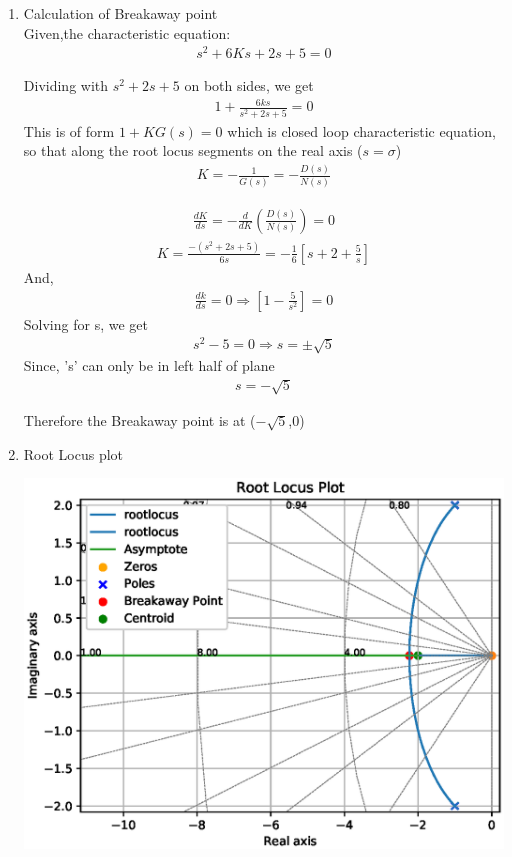 \begin{enumerate}[label=\thesection.\arabic*.,ref=\thesection.\theenumi]
\item Calculation of Breakaway point \\

Given,the characteristic equation:
    \begin{align}
        s^2 + 6Ks + 2s + 5 = 0    
    \end{align}
    
    Dividing with $s^2 + 2s + 5$ on both sides, we get
    \begin{align}
        1+\frac{6 k s}{s^{2}+2 s+5}=0    
    \end{align}
    This is of form $1+KG(s)=0$ which is closed loop characteristic equation, so that along the root locus
    segments on the real axis ($s = \sigma$)
    \begin{align}
        K=-\frac{1}{G(s)}=-\frac{D(s)}{N(s)}    
    \end{align}

    \begin{align}
        \frac{d K}{d s}=-\frac{d}{d K}\left(\frac{D(s)}{N(s)}\right)=0    
    \end{align}
    \begin{align}
        K=\frac{-\left(s^{2}+2 s+5\right)}{6 s}=-\frac{1}{6}\left[s+2+\frac{5}{s}\right]    
    \end{align}
    And,
    \begin{align}
        \frac{d k}{d s}=0 \Rightarrow\left[1-\frac{5}{s^{2}}\right]=0 
    \end{align}
    Solving for s, we get
    \begin{align}
        s^{2}-5=0 \Rightarrow s=\pm \sqrt{5}    
    \end{align}
    Since, 's' can only be in left half of plane
    \begin{align}
        \boxed{s=-\sqrt{5}}    
    \end{align}
    
    Therefore the Breakaway point is at ($-\sqrt{5}$,0)

    
\item Root Locus plot

	\includegraphics[width=\columnwidth]{./figs/ee18btech11046.eps}


\end{enumerate}
